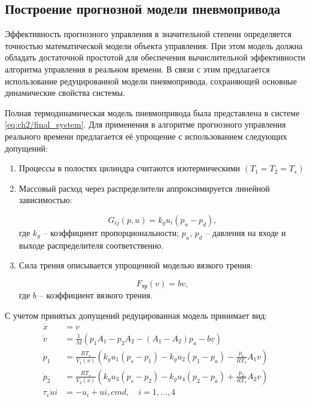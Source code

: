 \subsection{Построение прогнозной модели пневмопривода}\label{subsec:ch3/sec5/sub2}

Эффективность прогнозного управления в значительной степени определяется точностью
математической модели объекта управления. При этом модель должна обладать достаточной
простотой для обеспечения вычислительной эффективности алгоритма управления в
реальном времени. В связи с этим предлагается использование редуцированной
модели пневмопривода, сохраняющей основные динамические свойства системы.

Полная термодинамическая модель пневмопривода была представлена в системе \ref{eq:ch2/final_system}. Для применения в
алгоритме прогнозного управления реального времени предлагается её упрощение с использованием следующих допущений:

\begin{enumerate}
\item Процессы в полостях цилиндра считаются изотермическими $(T_1 = T_2 = T_s)$
\item Массовый расход через распределители аппроксимируется линейной зависимостью:

\begin{equation}
G_{ij}(p,u) = k_g u_i (p_u - p_d),
\end{equation}
где $k_g$ -- коэффициент пропорциональности;
$p_u$, $p_d$ -- давления на входе и выходе распределителя соответственно.

\item Сила трения описывается упрощенной моделью вязкого трения:

\begin{equation}
F_{\text{тр}}(v) = b v,
\end{equation}
где $b$ -- коэффициент вязкого трения.
\end{enumerate}

С учетом принятых допущений редуцированная модель принимает вид:
\begin{equation}
\begin{aligned}
\dot{x} &= v \\
\dot{v} &= \frac{1}{M}(p_1A_1 - p_2A_2 - (A_1-A_2)p_a - bv) \\
\dot{p}_1 &= \frac{RT_s}{V_1(x)}(k_g u_1(p_s - p_1) - k_g u_2(p_1 - p_a) - \frac{p_1}{RT_s}A_1v) \\
\dot{p}_2 &= \frac{RT_s}{V_2(x)}(k_g u_3(p_s - p_2) - k_g u_4(p_2 - p_a) + \frac{p_2}{RT_s}A_2v) \\
\tau_v\dot{u}i &= -u_i + u{i,cmd}, \quad i = 1,\ldots,4
\end{aligned}
\end{equation}

